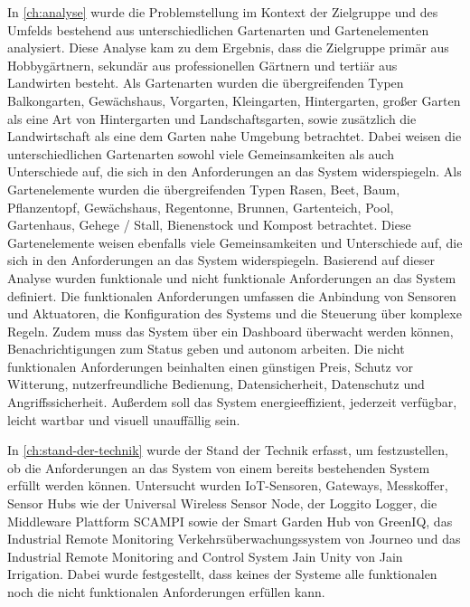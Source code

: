 In \cref{ch:analyse} wurde die Problemstellung im Kontext der Zielgruppe und des Umfelds bestehend aus unterschiedlichen Gartenarten und Gartenelementen analysiert.
Diese Analyse kam zu dem Ergebnis, dass die Zielgruppe primär aus Hobbygärtnern, sekundär aus professionellen Gärtnern und tertiär aus Landwirten besteht.
Als Gartenarten wurden die übergreifenden Typen Balkongarten, Gewächshaus, Vorgarten, Kleingarten, Hintergarten, großer Garten als eine Art von Hintergarten und Landschaftsgarten, sowie zusätzlich die Landwirtschaft als eine dem Garten nahe Umgebung betrachtet.
Dabei weisen die unterschiedlichen Gartenarten sowohl viele Gemeinsamkeiten als auch Unterschiede auf, die sich in den Anforderungen an das System widerspiegeln.
Als Gartenelemente wurden die übergreifenden Typen Rasen, Beet, Baum, Pflanzentopf, Gewächshaus, Regentonne, Brunnen, Gartenteich, Pool, Gartenhaus, Gehege / Stall, Bienenstock und Kompost betrachtet.
Diese Gartenelemente weisen ebenfalls viele Gemeinsamkeiten und Unterschiede auf, die sich in den Anforderungen an das System widerspiegeln.
Basierend auf dieser Analyse wurden funktionale und nicht funktionale Anforderungen an das System definiert.
Die funktionalen Anforderungen umfassen die Anbindung von Sensoren und Aktuatoren, die Konfiguration des Systems und die Steuerung über komplexe Regeln.
Zudem muss das System über ein Dashboard überwacht werden können, Benachrichtigungen zum Status geben und autonom arbeiten.
Die nicht funktionalen Anforderungen beinhalten einen günstigen Preis, Schutz vor Witterung, nutzerfreundliche Bedienung, Datensicherheit, Datenschutz und Angriffssicherheit.
Außerdem soll das System energieeffizient, jederzeit verfügbar, leicht wartbar und visuell unauffällig sein.

In \cref{ch:stand-der-technik} wurde der Stand der Technik erfasst, um festzustellen, ob die Anforderungen an das System von einem bereits bestehenden System erfüllt werden können.
Untersucht wurden IoT-Sensoren, Gateways, Messkoffer, Sensor Hubs wie der Universal Wireless Sensor Node, der Loggito Logger, die Middleware Plattform SCAMPI sowie der Smart Garden Hub von GreenIQ, das Industrial Remote Monitoring Verkehrsüberwachungssystem von Journeo und das Industrial Remote Monitoring and Control System Jain Unity von Jain Irrigation.
Dabei wurde festgestellt, dass keines der Systeme alle funktionalen noch die nicht funktionalen Anforderungen erfüllen kann.

